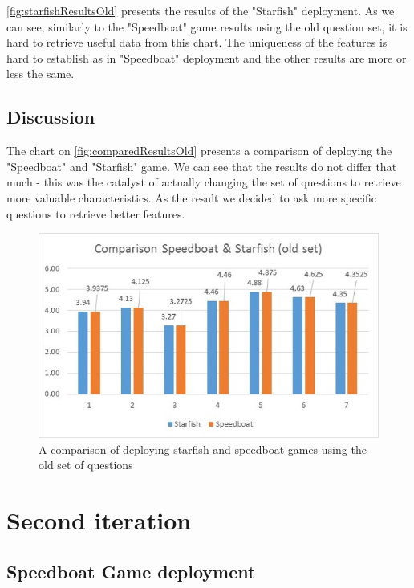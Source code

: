 \autoref{fig:starfishResultsOld} presents the results of the "Starfish" deployment. As we can see, similarly to the "Speedboat" game results using the old question set, it is hard to retrieve useful data from this chart. The uniqueness of the features is hard to establish as in "Speedboat" deployment and the other results are more or less the same. 

\subsection{Discussion}
The chart on \autoref{fig:comparedResultsOld} presents a comparison of deploying the "Speedboat" and "Starfish" game. We can see that the results do not differ that much - this was the catalyst of actually changing the set of questions to retrieve more valuable characteristics. As the result we decided to ask more specific questions to retrieve better features. 


\begin{figure}[!htbp]
\caption{A comparison of deploying starfish and speedboat games using the old set of questions}
\label{fig:comparedResultsOld}
\centering
\includegraphics[width=1\textwidth]{charts/comparisonOldSet}
\end{figure}

\section{Second iteration}
\label{sec:secondIt}
\subsection{Speedboat Game deployment}

